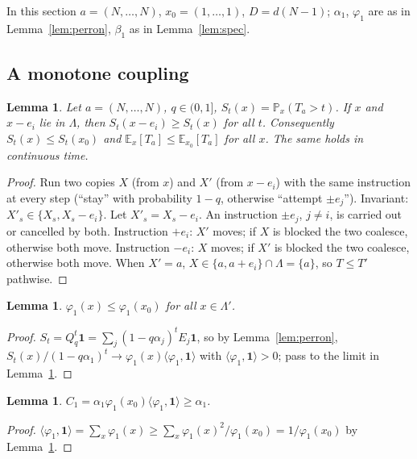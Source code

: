 \documentclass[11pt,a4paper]{article}
\newtheorem{lemma}[theorem]{Lemma}
\theoremstyle{definition}
\newcommand{\one}{\mathbf 1}
\newcommand{\Prob}{\mathbb P}
\newcommand{\E}{\mathbb E}
\begin{document}
In this section $a=(N,\dots,N)$, $x_0=(1,\dots,1)$, $D=d(N-1)$; $\alpha_1$, $\varphi_1$ are as in Lemma~\ref{lem:perron}, $\beta_1$ as in Lemma~\ref{lem:spec}.

\subsection{A monotone coupling}

\begin{lemma}\label{lem:coupling}
Let $a=(N,\dots,N)$, $q\in(0,1]$, $S_t(x)=\Prob_x(T_a>t)$. If $x$ and $x-e_i$ lie in $\Lambda$, then $S_t(x-e_i)\ge S_t(x)$ for all $t$. Consequently $S_t(x)\le S_t(x_0)$ and $\E_x[T_a]\le\E_{x_0}[T_a]$ for all $x$. The same holds in continuous time.
\end{lemma}
\begin{proof}
Run two copies $X$ (from $x$) and $X'$ (from $x-e_i$) with the same instruction at every step (``stay'' with probability $1-q$, otherwise ``attempt $\pm e_j$''). Invariant: $X'_s\in\{X_s,X_s-e_i\}$. Let $X'_s=X_s-e_i$. An instruction $\pm e_j$, $j\ne i$, is carried out or cancelled by both. Instruction $+e_i$: $X'$ moves; if $X$ is blocked the two coalesce, otherwise both move. Instruction $-e_i$: $X$ moves; if $X'$ is blocked the two coalesce, otherwise both move. When $X'=a$, $X\in\{a,a+e_i\}\cap\Lambda=\{a\}$, so $T\le T'$ pathwise.
\end{proof}

\begin{lemma}\label{lem:phimax}
$\varphi_1(x)\le\varphi_1(x_0)$ for all $x\in\Lambda'$.
\end{lemma}
\begin{proof}
$S_t=Q_q^t\one=\sum_j(1-q\alpha_j)^tE_j\one$, so by Lemma~\ref{lem:perron}, $S_t(x)/(1-q\alpha_1)^t\to\varphi_1(x)\langle\varphi_1,\one\rangle$ with $\langle\varphi_1,\one\rangle>0$; pass to the limit in Lemma~\ref{lem:coupling}.
\end{proof}

\begin{lemma}\label{lem:c1}
$C_1=\alpha_1\varphi_1(x_0)\langle\varphi_1,\one\rangle\ge\alpha_1$.
\end{lemma}
\begin{proof}
$\langle\varphi_1,\one\rangle=\sum_x\varphi_1(x)\ge\sum_x\varphi_1(x)^2/\varphi_1(x_0)=1/\varphi_1(x_0)$ by Lemma~\ref{lem:phimax}.
\end{proof}
\end{document}
